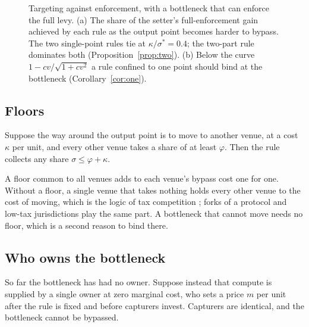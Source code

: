 \begin{figure}[t]
\caption{Targeting against enforcement, with a bottleneck that can enforce the full levy.
(a) The share of the setter's full-enforcement gain achieved by each rule as the output
point becomes harder to bypass. The two single-point rules tie at
$\kappa/\sigma^*=0.4$; the two-part rule dominates both
(Proposition~\ref{prop:two}). (b) Below the curve $1-cv/\sqrt{1+cv^2}$ a rule confined
to one point should bind at the bottleneck (Corollary~\ref{cor:one}).}
\label{fig:main}
\end{figure}

\subsection{Floors}

\begin{proposition}[Floors]\label{prop:floor}
Suppose the way around the output point is to move to another venue, at a cost $\kappa$
per unit, and every other venue takes a share of at least $\varphi$. Then the rule
collects any share $\sigma\le\varphi+\kappa$.
\end{proposition}

A floor common to all venues adds to each venue's bypass cost one for one. Without a
floor, a single venue that takes nothing holds every other venue to the cost of moving,
which is the logic of tax competition \citep{KeenKonrad2013}; forks of a protocol and
low-tax jurisdictions play the same part. A bottleneck that cannot move needs no floor,
which is a second reason to bind there.

\subsection{Who owns the bottleneck}

So far the bottleneck has had no owner. Suppose instead that compute is supplied by a
single owner at zero marginal cost, who sets a price $m$ per unit after the rule is fixed
and before capturers invest. Capturers are identical, and the bottleneck cannot be
bypassed.

